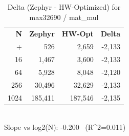 \begin{table}[tb]
    \centering
    \caption{Delta (Zephyr - HW-Optimized) for max32690 / mat_mul}
    \label{tab:delta_max32690_mat_mul}
    \scriptsize
    \begin{tabular}{r r r r}
        \hline
        \textbf{N} & \textbf{Zephyr} & \textbf{HW-Opt} & \textbf{Delta} \\\n+        \hline
        4 & 526 & 2,659 & -2,133\\
        16 & 1,467 & 3,600 & -2,133\\
        64 & 5,928 & 8,048 & -2,120\\
        256 & 30,496 & 32,629 & -2,133\\
        1024 & 185,411 & 187,546 & -2,135\\
        \hline
    \end{tabular}
    \vspace{2mm}\\\n    Slope vs log2(N): -0.200 \ (R^2=0.011)\n\end{table}
